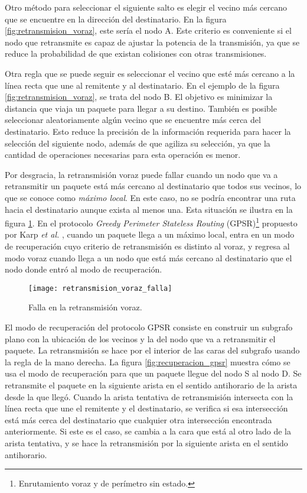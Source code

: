 Otro método para seleccionar el siguiente salto es elegir el vecino más cercano
que se encuentre en la dirección del destinatario. En la figura
\ref{fig:retransmision_voraz}, este sería el nodo A. Este criterio es
conveniente si el nodo que retransmite es capaz de ajustar la potencia de la
transmisión, ya que se reduce la probabilidad de que existan colisiones con
otras transmisiones.

Otra regla que se puede seguir es seleccionar el vecino que esté más cercano a
la línea recta que une al remitente y al destinatario. En el ejemplo de la
figura \ref{fig:retransmision_voraz}, se trata del nodo B. El objetivo es
minimizar la distancia que viaja un paquete para llegar a su destino. También
es posible seleccionar aleatoriamente algún vecino que se encuentre más cerca
del destinatario. Esto reduce la precisión de la información requerida para
hacer la selección del siguiente nodo, además de que agiliza su selección, ya
que la cantidad de operaciones necesarias para esta operación es menor.

Por desgracia, la retransmisión voraz puede fallar cuando un nodo que va a
retransmitir un paquete está más cercano al destinatario que todos sus vecinos,
lo que se conoce como \textit{máximo local}. En este caso, no se podría
encontrar una ruta hacia el destinatario aunque exista al menos una. Esta
situación se ilustra en la figura \ref{fig:retransmision_voraz_falla}. En el
protocolo \textit{Greedy Perimeter Stateless Routing}
(GPSR)\footnote{Enrutamiento voraz y de perímetro sin estado.} propuesto por
Karp \textit{et al.} \cite{Karp2000}, cuando un paquete llega a un máximo
local, entra en un modo de recuperación cuyo criterio de retransmisión es
distinto al voraz, y regresa al modo voraz cuando llega a un nodo que está más
cercano al destinatario que el nodo donde entró al modo de recuperación.

\begin{figure}[th]
\centering
\texttt{[image: retransmision\_voraz\_falla]}
\decoRule
\caption[Falla en la retransmisión voraz]{Falla en la retransmisión
voraz\protect\footnotemark.}
\label{fig:retransmision_voraz_falla}
\end{figure}


El modo de recuperación del protocolo GPSR consiste en construir un subgrafo
plano con la ubicación de los vecinos y la del nodo que va a retransmitir el
paquete. La retransmisión se hace por el interior de las caras del subgrafo
usando la regla de la mano derecha. La figura \ref{fig:recuperacion_gpsr}
muestra cómo se usa el modo de recuperación para que un paquete llegue del nodo
S al nodo D. Se retransmite el paquete en la siguiente arista en el sentido
antihorario de la arista desde la que llegó. Cuando la arista tentativa de
retransmisión intersecta con la línea recta que une el remitente y el
destinatario, se verifica si esa intersección está más cerca del destinatario
que cualquier otra intersección encontrada anteriormente. Si este es el caso,
se cambia a la cara que está al otro lado de la arista tentativa, y se hace la
retransmisión por la siguiente arista en el sentido antihorario.

